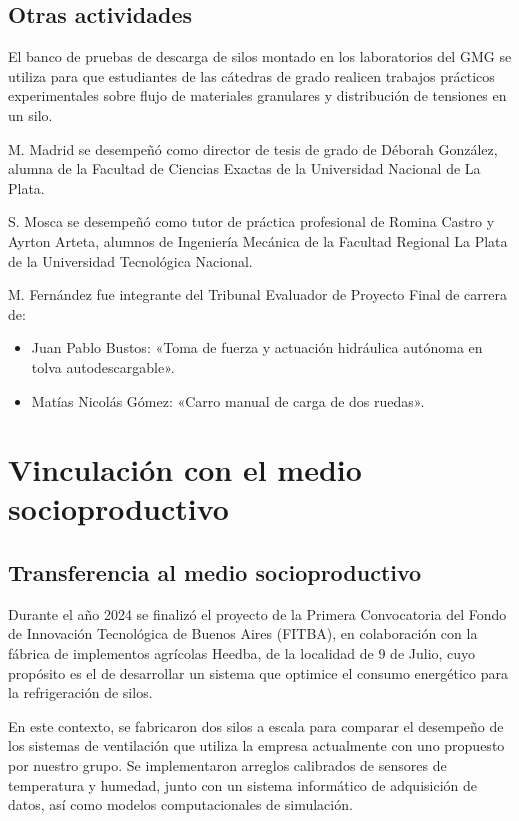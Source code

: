 \documentclass[a4paper,11pt,twoside,final,titlepage,onecolumn,openright]{report}
\begin{document}
\section{Otras actividades}

El banco de pruebas de descarga de silos montado en los laboratorios del GMG se utiliza para que estudiantes de las cátedras de grado realicen trabajos prácticos experimentales sobre flujo de materiales granulares y distribución de tensiones en un silo. 

M. Madrid se desempeñó como director de tesis de grado de Déborah González, alumna de la Facultad de Ciencias Exactas de la Universidad Nacional de La Plata.

S. Mosca se desempeñó como tutor de práctica profesional de Romina Castro y Ayrton Arteta, alumnos de Ingeniería Mecánica de la Facultad Regional La Plata de la Universidad Tecnológica Nacional.

M. Fernández fue integrante del Tribunal Evaluador de Proyecto Final de carrera de:
\begin{itemize}
  \item Juan Pablo Bustos: «Toma de fuerza y actuación hidráulica autónoma en tolva autodescargable».
  \item Matías Nicolás Gómez: «Carro manual de carga de dos ruedas».
  \end{itemize}

\chapter{Vinculación con el medio socioproductivo}

\section{Transferencia al medio socioproductivo}

Durante el año 2024 se finalizó el proyecto de la Primera Convocatoria del Fondo de Innovación Tecnológica de Buenos Aires (FITBA), en colaboración con la fábrica de implementos agrícolas Heedba, de la localidad de 9 de Julio, cuyo propósito es el de desarrollar un sistema que optimice el consumo energético para la refrigeración de silos. 

En este contexto, se fabricaron dos silos a escala para comparar el desempeño de los sistemas de ventilación que utiliza la empresa actualmente con uno propuesto por nuestro grupo. Se implementaron arreglos calibrados de sensores de temperatura y humedad, junto con un sistema informático de adquisición de datos, así como modelos computacionales de simulación. 
\end{document}
